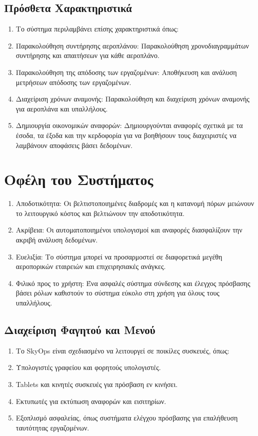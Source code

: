 \documentclass{article}
\begin{document}
	\subsection{Πρόσθετα Χαρακτηριστικά}
	\begin{enumerate}
		\item Το σύστημα περιλαμβάνει επίσης χαρακτηριστικά όπως:
		\item Παρακολούθηση συντήρησης αεροπλάνου: Παρακολούθηση χρονοδιαγραμμάτων συντήρησης και απαιτήσεων για κάθε αεροπλάνο.
		\item Παρακολούθηση της απόδοσης των εργαζομένων: Αποθήκευση και ανάλυση μετρήσεων απόδοσης των εργαζομένων.
		\item Διαχείριση χρόνων αναμονής: Παρακολούθηση και διαχείριση χρόνων αναμονής για αεροπλάνα και υπαλλήλους.
		\item Δημιουργία οικονομικών αναφορών: Δημιουργούνται αναφορές σχετικά με τα έσοδα, τα έξοδα και την κερδοφορία για να βοηθήσουν τους διαχειριστές να λαμβάνουν αποφάσεις βάσει δεδομένων.
	\end{enumerate}
	
	\section{Οφέλη του Συστήματος}
	\begin{enumerate}
		\item Αποδοτικότητα: Οι βελτιστοποιημένες διαδρομές και η κατανομή πόρων μειώνουν το λειτουργικό κόστος και βελτιώνουν την αποδοτικότητα.
		\item Ακρίβεια: Οι αυτοματοποιημένοι υπολογισμοί και αναφορές διασφαλίζουν την ακριβή ανάλυση δεδομένων.
		\item Ευελιξία: Το σύστημα μπορεί να προσαρμοστεί σε διαφορετικά μεγέθη αεροπορικών εταιρειών και επιχειρησιακές ανάγκες.
		\item Φιλικό προς το χρήστη: Ένα ασφαλές σύστημα σύνδεσης και έλεγχος πρόσβασης βάσει ρόλων καθιστούν το σύστημα εύκολο στη χρήση για όλους τους υπαλλήλους.
	\end{enumerate}
	
	\subsection{Διαχείριση Φαγητού και Μενού}
	\begin{enumerate}
		\item Το SkyOps είναι σχεδιασμένο να λειτουργεί σε ποικίλες συσκευές, όπως:
		\item Υπολογιστές γραφείου και φορητούς υπολογιστές. 
		\item Tablets και κινητές συσκευές για πρόσβαση εν κινήσει.
		\item Εκτυπωτές για εκτύπωση αναφορών και εισιτηρίων.  
		\item Εξοπλισμό ασφαλείας, όπως συστήματα ελέγχου πρόσβασης για επαλήθευση ταυτότητας εργαζομένων.   
	\end{enumerate}
	
\end{document}
